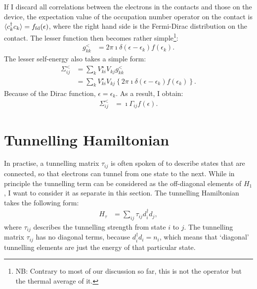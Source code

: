 If I discard all correlations between the electrons in the contacts and those on the device, the expectation value of the occupation number operator on the contact is $\braket{c_{k}^\dagger c_{k}}=f_\text{fd}(\epsilon)$, where the right hand side is the Fermi-Dirac distribution on the contact. The lesser function then becomes rather simple\footnote{NB: Contrary to most of our discussion so far, this is not the operator but the thermal average of it.}:
\begin{align*}
g^<_{kk} &= 2\pi\imath \delta(\epsilon-\epsilon_{k}) f(\epsilon_{k}).
\end{align*}
The lesser self-energy also takes a simple form:
\begin{align*}
\Sigma^<_{ij} &= \sum_{k} V_{ki}^\star V_{kj} g_{kk}^< \\&= \sum_{k} V_{ki}^\star V_{kj} \left\{2\pi\imath \delta(\epsilon-\epsilon_{k}) f(\epsilon_{k})\right\}.
\end{align*}
Because of the Dirac function, $\epsilon=\epsilon_{k}$. As a result, I obtain:
\begin{align}
\Sigma^<_{ij} &= \imath \Gamma_{ij} f(\epsilon) \label{eq:lesserself}.
\end{align}
\section{Tunnelling Hamiltonian}
\label{sec:tunnelling}
In practise, a tunnelling matrix $\tau_{ij}$ is often spoken of to describe states that are connected, so that electrons can tunnel from one state to the next. While in principle the tunnelling term can be considered as the off-diagonal elements of $H_1$, I want to consider it as separate in this section. The tunnelling Hamiltonian takes the following form:
\begin{align}
H_\tau &= \sum_{ij} \tau_{ij} d_i^\dagger d_j,
\label{eq:tunnelling}
\end{align}
where $\tau_{ij}$ describes the tunnelling strength from state $i$ to $j$. The tunnelling matrix $\tau_{ij}$ has no diagonal terms, because $d_i^\dagger d_i = n_i$, which means that `diagonal' tunnelling elements are just the energy of that particular state.


